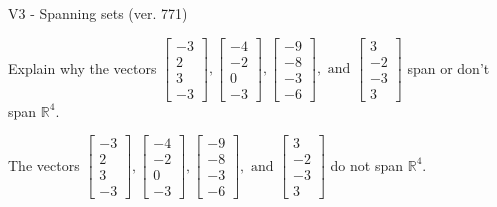 \begin{exercise}
  \begin{exerciseTitle}V3 - Spanning sets (ver. 771)\end{exerciseTitle}
  \begin{exerciseStatement}
    Explain why the vectors \(\left[\begin{array}{r}
-3 \\
2 \\
3 \\
-3
\end{array}\right] , \left[\begin{array}{r}
-4 \\
-2 \\
0 \\
-3
\end{array}\right] , \left[\begin{array}{r}
-9 \\
-8 \\
-3 \\
-6
\end{array}\right] , \text{ and } \left[\begin{array}{r}
3 \\
-2 \\
-3 \\
3
\end{array}\right]\) span or don't span \(\mathbb{R}^4\). 
	


  \end{exerciseStatement}
  \begin{exerciseAnswer}
   The vectors \(\left[\begin{array}{r}
-3 \\
2 \\
3 \\
-3
\end{array}\right] , \left[\begin{array}{r}
-4 \\
-2 \\
0 \\
-3
\end{array}\right] , \left[\begin{array}{r}
-9 \\
-8 \\
-3 \\
-6
\end{array}\right] , \text{ and } \left[\begin{array}{r}
3 \\
-2 \\
-3 \\
3
\end{array}\right]\) 
  	 do not  
	span \(\mathbb{R}^4\).
  


  \end{exerciseAnswer}
\end{exercise}